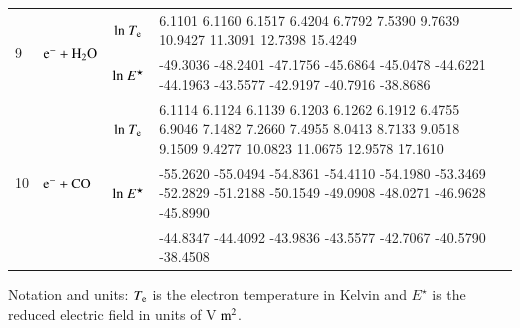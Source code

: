 \begin{table}[!htbp]
\begin{threeparttable}
\begin{tabular*}{1.1\textwidth}{l@{\extracolsep{\fill}}lcll}
    \midrule  
  \multirow{2}{*}{9} &  \multirow{2}{*}{ $\rm e^- + H_2 O$   } & ${\rm ln}~T_{\rm e}$  & \tiny         6.1101    6.1160    6.1517    6.4204    6.7792    7.5390    9.7639   10.9427   11.3091   12.7398   15.4249
  \\
  
  &  & ${\rm ln}~E^\star$     & \tiny      -49.3036  -48.2401  -47.1756  -45.6864  -45.0478  -44.6221  -44.1963  -43.5577  -42.9197  -40.7916  -38.8686
  \\  
  
  
    \midrule  
  \multirow{3}{*}{10} &  \multirow{3}{*}{ $\rm e^- + CO$   } & ${\rm ln}~T_{\rm e}$  & \tiny     6.1114    6.1124    6.1139    6.1203    6.1262    6.1912    6.4755    6.9046    7.1482    7.2660    7.4955    8.0413    8.7133    9.0518    9.1509    9.4277   10.0823   11.0675   12.9578   17.1610

  \\
  
  &  & ${\rm ln}~E^\star$     & \tiny  -55.2620  -55.0494  -54.8361  -54.4110  -54.1980  -53.3469  -52.2829  -51.2188  -50.1549  -49.0908  -48.0271  -46.9628  -45.8990  

  \\  
  
&  &   & \tiny -44.8347  -44.4092  -43.9836  -43.5577  -42.7067  -40.5790  -38.4508 \\
                       
    \bottomrule
    \end{tabular*}
\begin{tablenotes}
\item[{a}] Notation and units: $T_{\rm e}$ is the electron temperature in Kelvin and $E^\star$ is the reduced electric field in units of V$\rm ~m^2$.
\end{tablenotes}
   \end{threeparttable}
\end{table}
